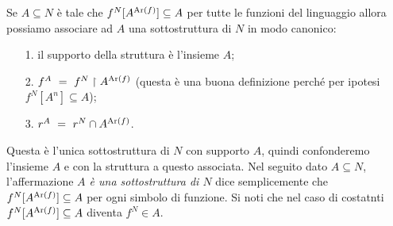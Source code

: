 Se $A\subseteq N$ \`e tale che $f^N[A^{{\rm Ar}(f)}]\subseteq A$ per tutte le funzioni del linguaggio allora possiamo associare ad $A$ una sottostruttura di $N$ in modo canonico:
\begin{itemize}
\item[1.] il supporto della struttura \`e l'insieme $A$;
\item[2.] $f^A\ =\ f^N\restriction A^{\Ar(f)}$ (questa \`e una buona definizione perch\'e per ipotesi $f^N[A^n]\subseteq A$);
\item[3.] $r^A\ =\ r^N\cap A^{\Ar(f)}$.
\end{itemize}
Questa \`e l'unica sottostruttura di $N$ con supporto $A$, quindi confonderemo l'insieme $A$ e con la struttura a questo associata. Nel seguito dato $A\subseteq N$, l'affermazione \emph{$A$ \`e una sottostruttura di $N$\/} dice semplicemente che $f^N[A^{{\rm Ar}(f)}]\subseteq A$ per ogni simbolo di funzione. Si noti che nel caso di costatnti $f^N[A^{{\rm Ar}(f)}]\subseteq A$ diventa $f^N\in A$.

